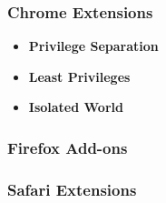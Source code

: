 	
\subsubsection{Chrome Extensions}
	
	\begin{itemize}
		\item \textbf{Privilege Separation}
		\item \textbf{Least Privileges} 
		\item \textbf{Isolated World}
	\end{itemize}


\subsubsection{Firefox Add-ons}


\subsubsection{Safari Extensions}